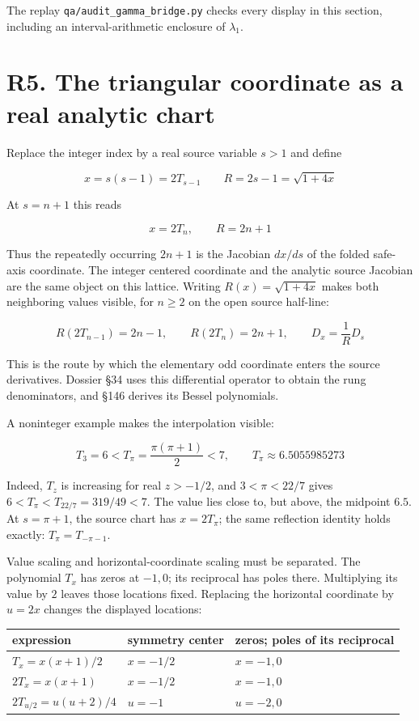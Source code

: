 \documentclass[
  11pt,
]{book}
\begin{document}
The replay \texttt{qa/audit\_gamma\_bridge.py} checks every display in
this section, including an interval-arithmetic enclosure of
\(\lambda_1\).

\section{R5. The triangular coordinate as a real analytic
chart}\label{r5.-the-triangular-coordinate-as-a-real-analytic-chart}

Replace the integer index by a real source variable \(s>1\) and define

\[
x=s(s-1)=2T_{s-1}
\qquad
R=2s-1=\sqrt{1+4x}
\tag{5.1}
\]

At \(s=n+1\) this reads

\[
\boxed{x=2T_n,\qquad R=2n+1}
\tag{5.2}
\]

Thus the repeatedly occurring \(2n+1\) is the Jacobian \(dx/ds\) of the
folded safe-axis coordinate. The integer centered coordinate and the
analytic source Jacobian are the same object on this lattice. Writing
\(R(x)=\sqrt{1+4x}\) makes both neighboring values visible, for
\(n\ge2\) on the open source half-line:

\[
R(2T_{n-1})=2n-1,\qquad R(2T_n)=2n+1,\qquad
D_x=\frac1R D_s
\tag{5.2a}
\]

This is the route by which the elementary odd coordinate enters the
source derivatives. Dossier §34 uses this differential operator to
obtain the rung denominators, and §146 derives its Bessel polynomials.

A noninteger example makes the interpolation visible:

\[
\boxed{T_3=6<T_\pi=\frac{\pi(\pi+1)}2<7,\qquad
T_\pi\approx6.5055985273}
\tag{5.3}
\]

Indeed, \(T_z\) is increasing for real \(z>-1/2\), and \(3<\pi<22/7\)
gives \(6<T_\pi<T_{22/7}=319/49<7\). The value lies close to, but above,
the midpoint \(6.5\). At \(s=\pi+1\), the source chart has \(x=2T_\pi\);
the same reflection identity holds exactly: \(T_\pi=T_{-\pi-1}\).

Value scaling and horizontal-coordinate scaling must be separated. The
polynomial \(T_x\) has zeros at \(-1,0\); its reciprocal has poles
there. Multiplying its value by \(2\) leaves those locations fixed.
Replacing the horizontal coordinate by \(u=2x\) changes the displayed
locations:

\begin{longtable}[]{@{}lll@{}}
\toprule\noalign{}
expression & symmetry center & zeros; poles of its reciprocal \\
\midrule\noalign{}
\endhead
\bottomrule\noalign{}
\endlastfoot
\(T_x=x(x+1)/2\) & \(x=-1/2\) & \(x=-1,0\) \\
\(2T_x=x(x+1)\) & \(x=-1/2\) & \(x=-1,0\) \\
\(2T_{u/2}=u(u+2)/4\) & \(u=-1\) & \(u=-2,0\) \\
\end{longtable}
\end{document}
